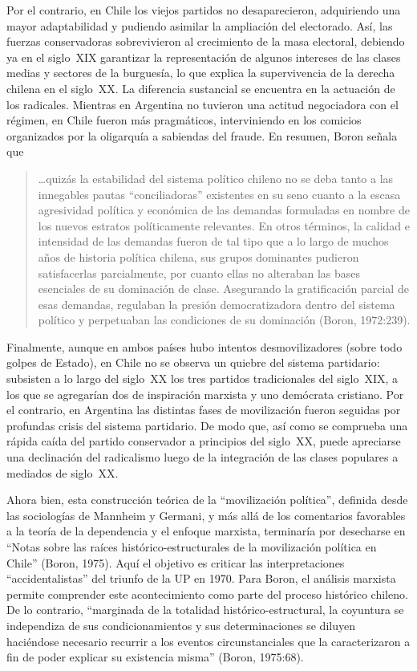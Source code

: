 Por el contrario, en Chile los viejos partidos no desaparecieron, adquiriendo una mayor adaptabilidad y pudiendo asimilar la ampliación del electorado. Así, las fuerzas conservadoras sobrevivieron al crecimiento de la masa electoral, debiendo ya en el siglo~XIX garantizar la representación de algunos intereses de las clases medias y sectores de la burguesía, lo que explica la supervivencia de la derecha chilena en el siglo~XX. La diferencia sustancial se encuentra en la actuación de los radicales. Mientras en Argentina no tuvieron una actitud negociadora con el régimen, en Chile fueron más pragmáticos, interviniendo en los comicios organizados por la oligarquía a sabiendas del fraude. En resumen, Boron señala que

\begin{quote}
\ldots quizás la estabilidad del sistema político chileno no se deba tanto a las innegables pautas \enquote{conciliadoras} existentes en su seno cuanto a la escasa agresividad política y económica de las demandas formuladas en nombre de los nuevos estratos políticamente relevantes. En otros términos, la calidad e intensidad de las demandas fueron de tal tipo que a lo largo de muchos años de historia política chilena, sus grupos dominantes pudieron satisfacerlas parcialmente, por cuanto ellas no alteraban las bases esenciales de su dominación de clase. Asegurando la gratificación parcial de esas demandas, regulaban la presión democratizadora dentro del sistema político y perpetuaban las condiciones de su dominación (Boron, 1972:239).
\end{quote}

Finalmente, aunque en ambos países hubo intentos desmovilizadores (sobre todo golpes de Estado), en Chile no se observa un quiebre del sistema partidario: subsisten a lo largo del siglo~XX los tres partidos tradicionales del siglo~XIX, a los que se agregarían dos de inspiración marxista y uno demócrata cristiano. Por el contrario, en Argentina las distintas fases de movilización fueron seguidas por profundas crisis del sistema partidario. De modo que, así como se comprueba una rápida caída del partido conservador a principios del siglo~XX, puede apreciarse una declinación del radicalismo luego de la integración de las clases populares a mediados de siglo~XX.

Ahora bien, esta construcción teórica de la \enquote{movilización política}, definida desde las sociologías de Mannheim y Germani, y más allá de los comentarios favorables a la teoría de la dependencia y el enfoque marxista, terminaría por desecharse en \enquote{Notas sobre las raíces histórico-estructurales de la movilización política en Chile} (Boron, 1975). Aquí el objetivo es criticar las interpretaciones \enquote{accidentalistas} del triunfo de la UP en 1970. Para Boron, el análisis marxista permite comprender este acontecimiento como parte del proceso histórico chileno. De lo contrario, \enquote{marginada de la totalidad histórico-estructural, la coyuntura se independiza de sus condicionamientos y sus determinaciones se diluyen haciéndose necesario recurrir a los eventos circunstanciales que la caracterizaron a fin de poder explicar su existencia misma} (Boron, 1975:68).

